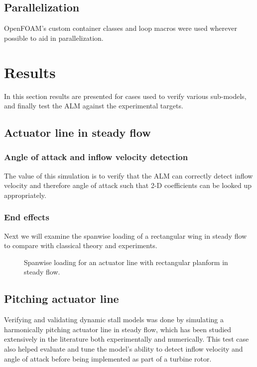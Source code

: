 \subsection{Parallelization}

OpenFOAM's custom container classes and loop macros were used wherever possible
to aid in parallelization.


\section{Results}

In this section results are presented for cases used to verify various
sub-models, and finally test the ALM against the experimental targets.


\subsection{Actuator line in steady flow}

\subsubsection{Angle of attack and inflow velocity detection}

The value of this simulation is to verify that the ALM can correctly detect
inflow velocity and therefore angle of attack such that 2-D coefficients can be
looked up appropriately.


\subsubsection{End effects}

Next we will examine the spanwise loading of a rectangular wing in steady flow
to compare with classical theory and experiments.

\begin{figure}
    \caption{Spanwise loading for an actuator line with rectangular planform in
        steady flow.}
    
    \label{fig:AL-spanwise}
\end{figure}


\subsection{Pitching actuator line}

Verifying and validating dynamic stall models was done by simulating a
harmonically pitching actuator line in steady flow, which has been studied
extensively in the literature both experimentally and numerically. This test
case also helped evaluate and tune the model's ability to detect inflow velocity
and angle of attack before being implemented as part of a turbine rotor.

